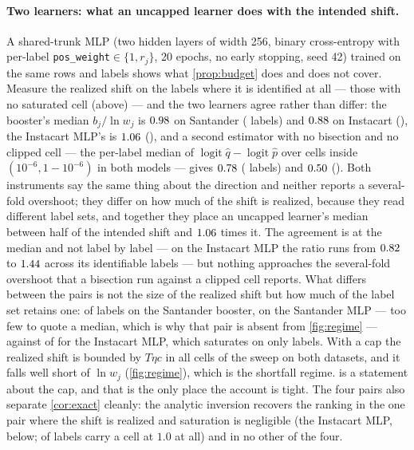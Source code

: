 \documentclass[sigconf,nonacm]{acmart}
\begin{document}
\paragraph{Two learners: what an uncapped learner does with the intended shift.} A shared-trunk MLP (two hidden layers of width 256, binary cross-entropy with per-label \texttt{pos\_weight}$\in\{1,r_j\}$, 20 epochs, no early stopping, seed 42) trained on the same rows and labels shows what \cref{prop:budget} does and does not cover. Measure the realized shift on the labels where it is identified at all --- those with no saturated cell (above) --- and the two learners agree rather than differ: the booster's median $b_j/\ln w_j$ is $0.98$ on Santander (\nSnIdentShift{} labels) and $0.88$ on Instacart (\nISnIdentShift), the Instacart MLP's is $1.06$ (\nIMSnIdentShift), and a second estimator with no bisection and no clipped cell --- the per-label median of $\operatorname{logit}\hat q-\operatorname{logit}\hat p$ over cells inside $(10^{-6},1-10^{-6})$ in both models --- gives $0.78$ (\nSnDirectShift{} labels) and $0.50$ (\nISnDirectShift). Both instruments say the same thing about the direction and neither reports a several-fold overshoot; they differ on how much of the shift is realized, because they read different label sets, and together they place an uncapped learner's median between half of the intended shift and $1.06$ times it. The agreement is at the median and not label by label --- on the Instacart MLP the ratio runs from $0.82$ to $1.44$ across its identifiable labels --- but nothing approaches the several-fold overshoot that a bisection run against a clipped cell reports. What differs between the pairs is not the size of the realized shift but how much of the label set retains one: \nSnIdentShift{} of \nnLabels{} labels on the Santander booster, \nMSnIdentShift{} on the Santander MLP --- too few to quote a median, which is why that pair is absent from \cref{fig:regime} --- against \nIMSnIdentShift{} of \nInLabels{} for the Instacart MLP, which saturates on only \nIMSnSatDroppedShift{} labels. With a cap the realized shift is bounded by $T\eta c$ in all \ncapN{} cells of the sweep on both datasets, and it falls well short of $\ln w_j$ (\cref{fig:regime}), which is the shortfall regime.  is a statement about the cap, and that is the only place the account is tight. The four pairs also separate \cref{cor:exact} cleanly: the analytic inversion recovers the ranking in the one pair where the shift is realized and saturation is negligible (the Instacart MLP, below; \nIMSnSatDroppedShift{} of \nInLabels{} labels carry a cell at $1.0$ at all) and in no other of the four.
\end{document}
